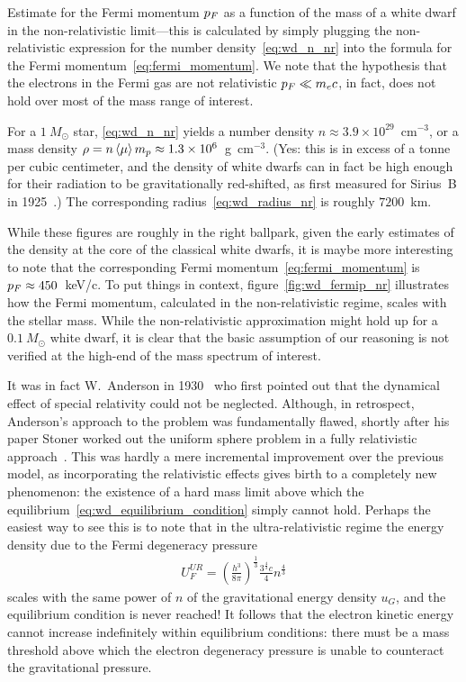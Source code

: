 \begin{marginfigure}
	
	\caption{Estimate for the Fermi momentum $p_F$ as a function of the mass of a
    white dwarf in the non-relativistic limit---this is calculated by simply
    plugging the non-relativistic expression for the number density~\eqref{eq:wd_n_nr}
    into the formula for the Fermi momentum~\eqref{eq:fermi_momentum}. We note
    that the hypothesis that the electrons in the Fermi gas are not relativistic
    $p_F \ll m_e c$, in fact, does not hold over most of the mass range of
    interest.}
    \label{fig:wd_fermip_nr}
\end{marginfigure}

For a $1~M_\odot$ star, \eqref{eq:wd_n_nr} yields a number density
$n \approx 3.9 \times 10^{29}$~cm$^{-3}$, or a mass density
$\rho = n \left<\mu\right> m_p \approx 1.3 \times 10^6$~g~cm$^{-3}$.
(Yes: this is in excess of a tonne per cubic centimeter, and the density of white
dwarfs can in fact be high enough for their radiation to be gravitationally red-shifted,
as first measured for Sirius~B in 1925~\cite{1925PNAS...11..382A}.) The corresponding
radius~\eqref{eq:wd_radius_nr} is roughly $7200$~km.

While these figures are roughly in the right ballpark, given the early estimates
of the density at the core of the classical white dwarfs, it is maybe more
interesting to note that the corresponding Fermi momentum~\eqref{eq:fermi_momentum}
is $p_F \approx 450$~keV/c. To put things in context, figure~\ref{fig:wd_fermip_nr}
illustrates how the Fermi momentum, calculated in the non-relativistic regime,
scales with the stellar mass. While the non-relativistic approximation might
hold up for a $0.1~M_\odot$ white dwarf, it is clear that the basic assumption of
our reasoning is not verified at the high-end of the mass spectrum of interest.

It was in fact W.~Anderson in 1930~\cite{1929ZPhy...56..851A} who first pointed
out that the dynamical effect of special relativity could not be neglected.
Although, in retrospect, Anderson's approach to the problem was fundamentally
flawed, shortly after his paper Stoner worked out the uniform sphere problem in
a fully relativistic approach~\cite{1930LEDPM...9..944S}. This was hardly a mere
incremental improvement over the previous model, as incorporating the relativistic
effects gives birth to a completely new phenomenon: the existence of a hard mass
limit above which the equilibrium~\ref{eq:wd_equilibrium_condition} simply cannot
hold. Perhaps the easiest way to see this is to note that in the ultra-relativistic
regime the energy density due to the Fermi degeneracy pressure
\begin{align*}
	U_F^{UR} = \left( \frac{h^3}{8\pi} \right)^\frac{1}{3}
	\frac{3^\frac{4}{3} c}{4} n^\frac{4}{3}
\end{align*}
scales with the same power of $n$ of the gravitational energy density $u_G$, and the
equilibrium condition is never reached! It follows that the electron kinetic
energy cannot increase indefinitely within equilibrium conditions: there must be
a mass threshold above which the electron degeneracy pressure is unable to counteract
the gravitational pressure.

